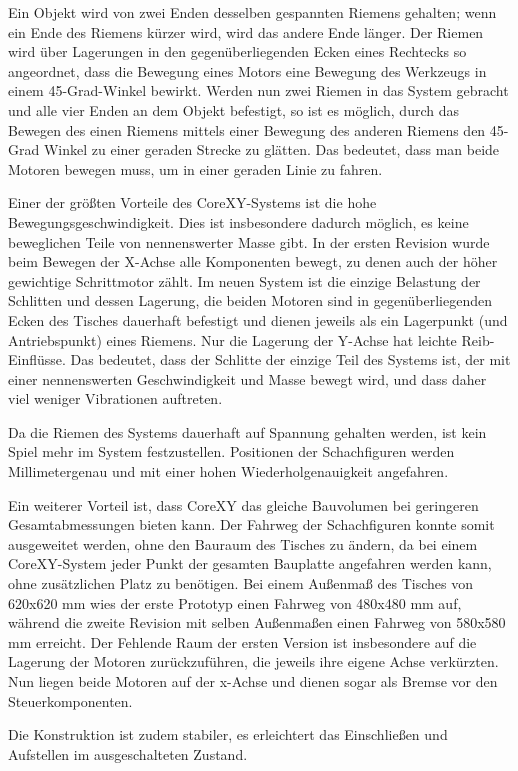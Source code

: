 Ein Objekt wird von zwei Enden desselben gespannten Riemens gehalten;
wenn ein Ende des Riemens kürzer wird, wird das andere Ende länger. Der
Riemen wird über Lagerungen in den gegenüberliegenden Ecken eines
Rechtecks so angeordnet, dass die Bewegung eines Motors eine Bewegung
des Werkzeugs in einem 45-Grad-Winkel bewirkt. Werden nun zwei Riemen in
das System gebracht und alle vier Enden an dem Objekt befestigt, so ist
es möglich, durch das Bewegen des einen Riemens mittels einer Bewegung
des anderen Riemens den 45-Grad Winkel zu einer geraden Strecke zu
glätten. Das bedeutet, dass man beide Motoren bewegen muss, um in einer
geraden Linie zu fahren.

Einer der größten Vorteile des CoreXY-Systems ist die hohe
Bewegungsgeschwindigkeit. Dies ist insbesondere dadurch möglich, es
keine beweglichen Teile von nennenswerter Masse gibt. In der ersten
Revision wurde beim Bewegen der X-Achse alle Komponenten bewegt, zu
denen auch der höher gewichtige Schrittmotor zählt. Im neuen System ist
die einzige Belastung der Schlitten und dessen Lagerung, die beiden
Motoren sind in gegenüberliegenden Ecken des Tisches dauerhaft befestigt
und dienen jeweils als ein Lagerpunkt (und Antriebspunkt) eines Riemens.
Nur die Lagerung der Y-Achse hat leichte Reib-Einflüsse. Das bedeutet,
dass der Schlitte der einzige Teil des Systems ist, der mit einer
nennenswerten Geschwindigkeit und Masse bewegt wird, und dass daher viel
weniger Vibrationen auftreten.

Da die Riemen des Systems dauerhaft auf Spannung gehalten werden, ist
kein Spiel mehr im System festzustellen. Positionen der Schachfiguren
werden Millimetergenau und mit einer hohen Wiederholgenauigkeit
angefahren.

Ein weiterer Vorteil ist, dass CoreXY das gleiche Bauvolumen bei
geringeren Gesamtabmessungen bieten kann. Der Fahrweg der Schachfiguren
konnte somit ausgeweitet werden, ohne den Bauraum des Tisches zu ändern,
da bei einem CoreXY-System jeder Punkt der gesamten Bauplatte angefahren
werden kann, ohne zusätzlichen Platz zu benötigen. Bei einem Außenmaß
des Tisches von 620x620 mm wies der erste Prototyp einen Fahrweg von
480x480 mm auf, während die zweite Revision mit selben Außenmaßen einen
Fahrweg von 580x580 mm erreicht. Der Fehlende Raum der ersten Version
ist insbesondere auf die Lagerung der Motoren zurückzuführen, die
jeweils ihre eigene Achse verkürzten. Nun liegen beide Motoren auf der
x-Achse und dienen sogar als Bremse vor den Steuerkomponenten.

Die Konstruktion ist zudem stabiler, es erleichtert das Einschließen und
Aufstellen im ausgeschalteten Zustand.

